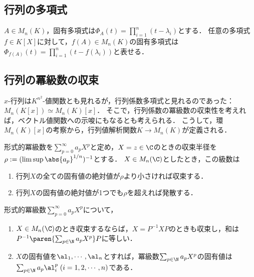 \documentclass[uplatex, dvipdfmx]{jsreport}
\begin{document}
\subsection{行列の多項式}

\begin{theorem}[固有多項式]
    $A\in M_n(K)$，固有多項式は$\Phi_A(t)=\prod^n_{i=1}(t-\lambda_i)$とする．
    任意の多項式$f\in K[X]$に対して，$f(A)\in M_n(K)$の固有多項式は$\Phi_{f(A)}(t)=\prod^n_{i=1}(t-f(\lambda_i))$と表せる．
\end{theorem}

\subsection{行列の冪級数の収束}

\begin{tcolorbox}[colframe=ForestGreen, colback=ForestGreen!10!white,breakable,colbacktitle=ForestGreen!40!white,coltitle=black,fonttitle=\bfseries\sffamily,
title=]
    $x$-行列は$K^{n^2}$-値関数とも見れるが，行列係数多項式と見れるのであった：$M_n(K[x])\simeq M_n(K)[x]$．
    そこで，行列係数の冪級数の収束性を考えれば，ベクトル値関数への示唆にもなるとも考えられる．
    こうして，環$M_n(K)[x]$の考察から，行列値解析関数$K\to M_n(K)$が定義される．
\end{tcolorbox}

\begin{theorem}[行列の冪級数の収束性]
    形式的冪級数を$\sum_{p=0}^\infty a_pX^p$と定め，$X=z\in\C$のときの収束半径を$\rho:=(\limsup\abs{a_p}^{1/n})^{-1}$とする．
    $X\in M_n(\C)$としたとき，この級数は
    \begin{enumerate}
        \item 行列$X$の全ての固有値の絶対値が$\rho$より小さければ収束する．
        \item 行列$X$の固有値の絶対値が1つでも$\rho$を超えれば発散する．
    \end{enumerate}
\end{theorem}

\begin{corollary}
    形式的冪級数$\sum_{p=0}^\infty a_pX^p$について，
    \begin{enumerate}
        \item $X\in M_n(\C)$のとき収束するならば，$X=P^{-1}XP$のときも収束し，和は$P^{-1}\paren{\sum_{p\in\N}a_pX^p}P$に等しい．
        \item $X$の固有値を$\al_1,\cdots,\al_n$とすれば，冪級数$\sum_{p\in\N}a_pX^p$の固有値は$\sum_{p\in\N}a_p\al_i^p\;(i=1,2,\cdots,n)$である．
    \end{enumerate}
\end{corollary}
\end{document}

